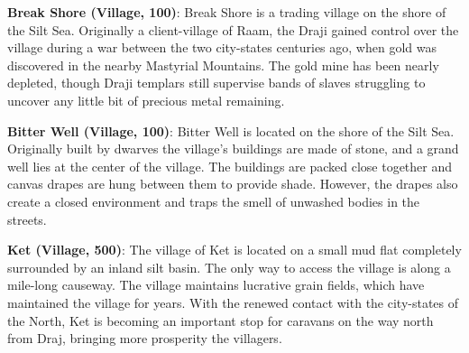 {
	\textbf{Break Shore (Village, 100)}: Break Shore is a trading village on the shore of the Silt Sea. Originally a client-village of Raam, the Draji gained control over the village during a war between the two city-states centuries ago, when gold was discovered in the nearby Mastyrial Mountains. The gold mine has been nearly depleted, though Draji templars still supervise bands of slaves struggling to uncover any little bit of precious metal remaining.

	\textbf{Bitter Well (Village, 100)}: Bitter Well is located on the shore of the Silt Sea. Originally built by dwarves the village's buildings are made of stone, and a grand well lies at the center of the village. The buildings are packed close together and canvas drapes are hung between them to provide shade. However, the drapes also create a closed environment and traps the smell of unwashed bodies in the streets.

	\textbf{Ket (Village, 500)}: The village of Ket is located on a small mud flat completely surrounded by an inland silt basin. The only way to access the village is along a mile-long causeway. The village maintains lucrative grain fields, which have maintained the village for years. With the renewed contact with the city-states of the North, Ket is becoming an important stop for caravans on the way north from Draj, bringing more prosperity the villagers.
}
